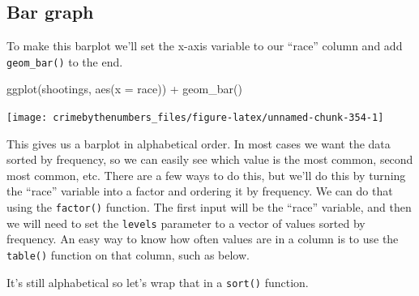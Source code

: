 \documentclass[
  a4paper,
]{krantz}
\makeatletter
\newenvironment{Shaded}{\begin{snugshade}}{\end{snugshade}}
\newcommand{\AttributeTok}[1]{\textcolor[rgb]{0.61,0.61,0.61}{#1}}
\newcommand{\CommentTok}[1]{\textcolor[rgb]{0.37,0.37,0.37}{\textit{#1}}}
\newcommand{\FunctionTok}[1]{\textcolor[rgb]{0,0,0}{#1}}
\newcommand{\NormalTok}[1]{#1}
\newcommand{\SpecialCharTok}[1]{\textcolor[rgb]{0,0,0}{#1}}
\newenvironment{kframe}{%
\medskip{}
\setlength{\fboxsep}{.8em}
 \def\at@end@of@kframe{}%
 \ifinner\ifhmode%
  \def\at@end@of@kframe{\end{minipage}}%
  \begin{minipage}{\columnwidth}%
 \fi\fi%
 \def\FrameCommand##1{\hskip\@totalleftmargin \hskip-\fboxsep
 \colorbox{shadecolor}{##1}\hskip-\fboxsep
     \hskip-\linewidth \hskip-\@totalleftmargin \hskip\columnwidth}%
 \MakeFramed {\advance\hsize-\width
   \@totalleftmargin\z@ \linewidth\hsize
   \@setminipage}}%
 {\par\unskip\endMakeFramed%
 \at@end@of@kframe}
\renewenvironment{Shaded}{\begin{kframe}}{\end{kframe}}
\makeatother
\begin{document}
\hypertarget{bar-graph}{%
\subsection{Bar graph}\label{bar-graph}}

To make this barplot we'll set the x-axis variable to our
``race'' column and add \texttt{geom\_bar()} to the end.

\begin{Shaded}
\begin{Highlighting}[]
\FunctionTok{ggplot}\NormalTok{(shootings, }\FunctionTok{aes}\NormalTok{(}\AttributeTok{x =}\NormalTok{ race)) }\SpecialCharTok{+}
  \FunctionTok{geom\_bar}\NormalTok{()}
\end{Highlighting}
\end{Shaded}

\begin{center}\texttt{[image: crimebythenumbers\_files/figure-latex/unnamed-chunk-354-1]} \end{center}

This gives us a barplot in alphabetical order. In most cases
we want the data sorted by frequency, so we can easily see
which value is the most common, second most common, etc.
There are a few ways to do this, but we'll do this by
turning the ``race'' variable into a factor and ordering it
by frequency. We can do that using the \texttt{factor()}
function. The first input will be the ``race'' variable, and
then we will need to set the \texttt{levels} parameter to a
vector of values sorted by frequency. An easy way to know
how often values are in a column is to use the
\texttt{table()} function on that column, such as below.

\begin{Shaded}
\end{Shaded}

It's still alphabetical so let's wrap that in a
\texttt{sort()} function.

\begin{Shaded}
\end{Shaded}
\end{document}
